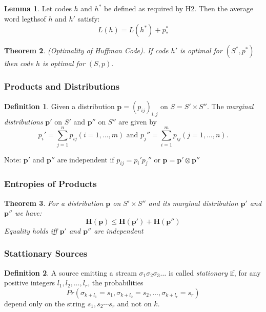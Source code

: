\documentclass[a4paper]{article}
\newtheorem{theorem}{Theorem}
\theoremstyle{definition} \newtheorem*{definition}{Definition}
\newtheorem{lemma}[theorem]{Lemma}
\newcommand{\ent}{\bm{H}}
\newcommand{\pr}{\bm{p}}
\begin{document}
\begin{lemma}
  Let codes $h$ and $h^*$ be defined as required by H2. Then the average
  word legthsof $h$ and $h'$ satisfy:
  \[
    L(h)=L(h^*)+p_*^*
  \]
  \label{avgwordlength}
\end{lemma}

\begin{theorem}
  (Optimality of Huffman Code). 
  If code $h'$ is optimal for $(S^*,p^*)$ then code $h$ is optimal for
  $(S,p).$
  \label{optimalhuff}
\end{theorem}

\subsubsection*{Products and Distributions}
\begin{definition}
  Given a distribution $\bm{p} = (p_{ij})_{i,j}$ on $S = S' \times S''$.
  The \emph{marginal distributions} $\pr'$ on $S'$ and $\pr''$ on $S''$
  are given by 
  \[
    p_i' = \sum_{j=1}^{n}p_{ij} (i = 1,\dots,m) \text{ and }
    p_j'' = \sum_{i=1}^{m}p_{ij} (j = 1,\dots,n).
  \]

  Note: $\pr'$ and $\pr''$ are independent if $p_{ij}=p_i'p_j''$ or
  $\pr=\pr' \otimes \pr''$
\end{definition}

\subsubsection*{Entropies of Products}
\begin{theorem}
  For a distribution $\pr$ on $S' \times S''$ and its marginal 
  distribution $\pr'$ and $\pr''$ we have:
  \begin{equation}
    \ent(\pr) \le \ent(\pr') + \ent(\pr'')
    \label{entropyproduct}
  \end{equation}
  Equality holds iff $\pr'$ and $\pr''$ are independent
  \label{entropyproduct}
\end{theorem}

\subsubsection*{Stattionary Sources}
\begin{definition}
  A source emitting a stream $\sigma_1\sigma_2\sigma_3\dots$ is called 
  \emph{stationary} if, for any positive integers $l_1,l_2,\dots,l_r$,
  the probabilities
  \begin{equation}
    Pr(\sigma_{k+l_1}=s_1,\sigma_{k+l_2}=s_2,\dots,\sigma_{k+l_r}=s_r)
    \label{stationary}
  \end{equation}
  depend only on the string $s_1,s_2\cdots s_r$ and not on $k$.
\end{definition}
\end{document}
